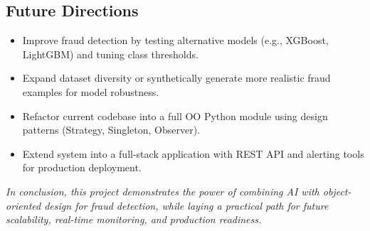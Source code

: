 \documentclass[12pt]{article}
\begin{document}
\subsection{Future Directions}
\begin{itemize}[leftmargin=*]
    \item Improve fraud detection by testing alternative models (e.g., XGBoost, LightGBM) and tuning class thresholds.
    \item Expand dataset diversity or synthetically generate more realistic fraud examples for model robustness.
    \item Refactor current codebase into a full OO Python module using design patterns (Strategy, Singleton, Observer).
    \item Extend system into a full-stack application with REST API and alerting tools for production deployment.
\end{itemize}

\vspace{1em}
\noindent \textit{In conclusion, this project demonstrates the power of combining AI with object-oriented design for fraud detection, while laying a practical path for future scalability, real-time monitoring, and production readiness.}



\end{document}
